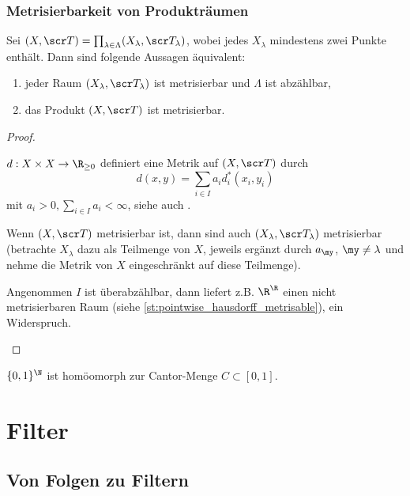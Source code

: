 \subsubsection{Metrisierbarkeit von Produkträumen}

\begin{st}
	Sei $(X, \scr T) = \prod_{\lambda \in \Lambda} (X_\lambda, \scr T_\lambda)$, wobei jedes $X_\lambda$ mindestens zwei Punkte enthält.
	Dann sind folgende Aussagen äquivalent:
	\begin{enumerate}[1)]
		\item
			jeder Raum $(X_\lambda, \scr T_\lambda)$ ist metrisierbar und $\Lambda$ ist abzählbar,
		\item
			das Produkt $(X, \scr T)$ ist metrisierbar.
	\end{enumerate}
	\begin{proof}
		\begin{segnb}[„$\implies$“]
			$d: X \times X \to \R_{\ge 0}$ definiert eine Metrik auf $(X, \scr T)$ durch
			\[
				d(x,y) = \sum_{i\in I} a_i d_i^*(x_i, y_i)
			\]
			mit $a_i > 0, \sum_{i\in I} a_i < \infty$, siehe auch .
		\end{segnb}
		\begin{segnb}[„$\impliedby$“]
			Wenn $(X, \scr T)$ metrisierbar ist, dann sind auch $(X_\lambda, \scr T_\lambda)$ metrisierbar (betrachte $X_\lambda$ dazu als Teilmenge von $X$, jeweils ergänzt durch $a_\my$, $\my \neq \lambda$ und nehme die Metrik von $X$ eingeschränkt auf diese Teilmenge).

			Angenommen $I$ ist überabzählbar, dann liefert z.B. $\R^\R$ einen nicht metrisierbaren Raum (siehe \ref{st:pointwise_hausdorff_metrisable}), ein Widerspruch.
		\end{segnb}
	\end{proof}
\end{st}

\begin{ex}
	$\{0,1\}^\N$ ist homöomorph zur Cantor-Menge $C \subset [0,1]$.
\end{ex}


\section{Filter}


\subsection{Von Folgen zu Filtern}


